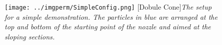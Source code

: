 \begin{figure}[H]
\centering
\texttt{[image: ../imgperm/SimpleConfig.png]}
[Dobule Cone]{\textit{The setup for a simple demonstration. The particles in blue are arranged at the top and bottom of the starting point of the nozzle and aimed at the sloping sections.}}
\label{fig:SimpleConfig}
\end{figure}
